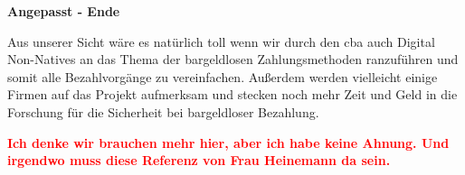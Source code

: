 \textbf{Angepasst - Ende}


Aus unserer Sicht wäre es natürlich toll wenn wir durch den \acrfull{cba} auch Digital Non-Natives an das Thema der 
bargeldlosen Zahlungsmethoden ranzuführen und somit alle Bezahlvorgänge zu vereinfachen.
Außerdem werden vielleicht einige Firmen auf das Projekt aufmerksam und stecken noch mehr Zeit und Geld in die Forschung für die Sicherheit bei 
bargeldloser Bezahlung.


\textcolor{red}{\textbf{Ich denke wir brauchen mehr hier, aber ich habe keine Ahnung. Und irgendwo muss diese Referenz
von Frau Heinemann da sein.}}

